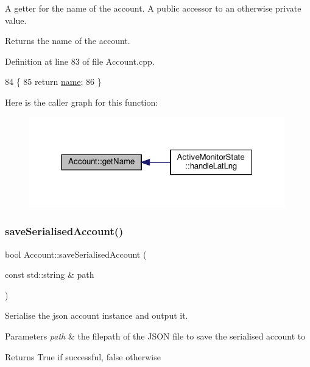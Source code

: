 A getter for the name of the account. A public accessor to an otherwise private value.

\begin{DoxyReturn}{Returns}
the name of the account. 
\end{DoxyReturn}


Definition at line 83 of file Account.\+cpp.


\begin{DoxyCode}
84 \{
85     \textcolor{keywordflow}{return} \hyperlink{class_account_a586e2c3461c5231eacf7c96851024a75}{name};
86 \}
\end{DoxyCode}
Here is the caller graph for this function\+:
\nopagebreak
\begin{figure}[H]
\begin{center}
\leavevmode
\includegraphics[width=314pt]{db/d22/class_account_a1ef22885e8c6f145475c3306a4e6d74a_icgraph}
\end{center}
\end{figure}
\mbox{\label{class_account_a9ff3a257536bc933e0a39207bb89243d}} 
\subsubsection{\texorpdfstring{save\+Serialised\+Account()}{saveSerialisedAccount()}}
{\footnotesize\ttfamily bool Account\+::save\+Serialised\+Account (\begin{DoxyParamCaption}\item[{const std\+::string \&}]{path }\end{DoxyParamCaption})}

Serialise the json account instance and output it.


\begin{DoxyParams}{Parameters}
{\em path} & the filepath of the J\+S\+ON file to save the serialised account to \\
\hline
\end{DoxyParams}
\begin{DoxyReturn}{Returns}
True if successful, false otherwise 
\end{DoxyReturn}


